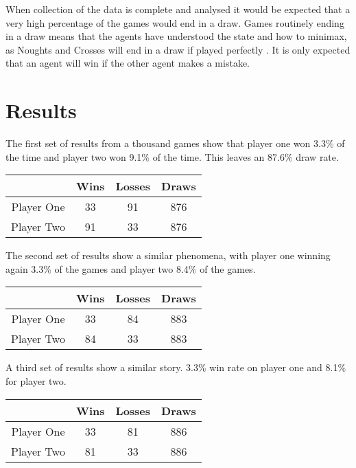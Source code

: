 \documentclass[conference]{IEEEtran}
\begin{document}
When collection of the data is complete and analysed it would be expected that a very high percentage of the games would end in a draw. Games routinely ending in a draw means that the agents have understood the state and how to minimax, as Noughts and Crosses will end in a draw if played perfectly \cite{qmuloxo}. It is only expected that an agent will win if the other agent makes a mistake.

\section{Results}
The first set of results from a thousand games show that player one won 3.3\% of the time and player two won 9.1\% of the time. This leaves an 87.6\% draw rate.

\begin{center}
	\begin{tabular}{||c c c c||}
		\hline
		 {} & Wins & Losses & Draws \\ [0.5ex] 
		\hline\hline
		Player One & 33 & 91 & 876\\
		\hline
		Player Two & 91 & 33 & 876\\
	\end{tabular}
\end{center}

The second set of results show a similar phenomena, with player one winning again 3.3\% of the games and player two 8.4\% of the games.

\begin{center}
	\begin{tabular}{||c c c c||}
		\hline
		{} & Wins & Losses & Draws \\ [0.5ex] 
		\hline\hline
		Player One & 33 & 84 & 883\\
		\hline
		Player Two & 84 & 33 & 883\\
	\end{tabular}
\end{center}

A third set of results show a similar story. 3.3\% win rate on player one and 8.1\% for player two. 

\begin{center}
	\begin{tabular}{||c c c c||}
		\hline
		{} & Wins & Losses & Draws \\ [0.5ex] 
		\hline\hline
		Player One & 33 & 81 & 886\\
		\hline
		Player Two & 81 & 33 & 886\\
	\end{tabular}
\end{center}
\end{document}
